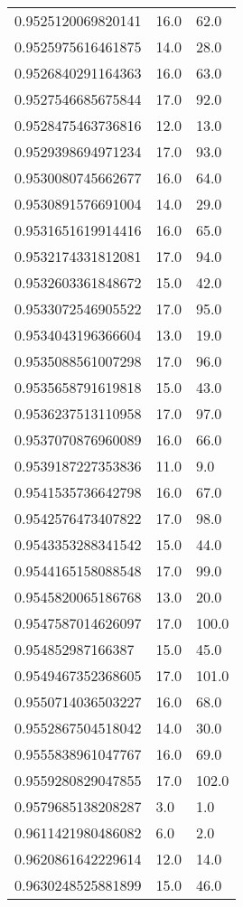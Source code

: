 \begin{center}
\begin{supertabular}[H]{p{0.30\textwidth}p{0.05\textwidth}p{0.05\textwidth}}
0.9525120069820141 & 16.0 & 62.0 \\ 
0.9525975616461875 & 14.0 & 28.0 \\ 
0.9526840291164363 & 16.0 & 63.0 \\ 
0.9527546685675844 & 17.0 & 92.0 \\ 
0.9528475463736816 & 12.0 & 13.0 \\ 
0.9529398694971234 & 17.0 & 93.0 \\ 
0.9530080745662677 & 16.0 & 64.0 \\ 
0.9530891576691004 & 14.0 & 29.0 \\ 
0.9531651619914416 & 16.0 & 65.0 \\ 
0.9532174331812081 & 17.0 & 94.0 \\ 
0.9532603361848672 & 15.0 & 42.0 \\ 
0.9533072546905522 & 17.0 & 95.0 \\ 
0.9534043196366604 & 13.0 & 19.0 \\ 
0.9535088561007298 & 17.0 & 96.0 \\ 
0.9535658791619818 & 15.0 & 43.0 \\ 
0.9536237513110958 & 17.0 & 97.0 \\ 
0.9537070876960089 & 16.0 & 66.0 \\ 
0.9539187227353836 & 11.0 & 9.0 \\ 
0.9541535736642798 & 16.0 & 67.0 \\ 
0.9542576473407822 & 17.0 & 98.0 \\ 
0.9543353288341542 & 15.0 & 44.0 \\ 
0.9544165158088548 & 17.0 & 99.0 \\ 
0.9545820065186768 & 13.0 & 20.0 \\ 
0.9547587014626097 & 17.0 & 100.0 \\ 
0.954852987166387 & 15.0 & 45.0 \\ 
0.9549467352368605 & 17.0 & 101.0 \\ 
0.9550714036503227 & 16.0 & 68.0 \\ 
0.9552867504518042 & 14.0 & 30.0 \\ 
0.9555838961047767 & 16.0 & 69.0 \\ 
0.9559280829047855 & 17.0 & 102.0 \\ 
0.9579685138208287 & 3.0 & 1.0 \\ 
0.9611421980486082 & 6.0 & 2.0 \\ 
0.9620861642229614 & 12.0 & 14.0 \\ 
0.9630248525881899 & 15.0 & 46.0 \\ 

\end{supertabular}
\end{center}
